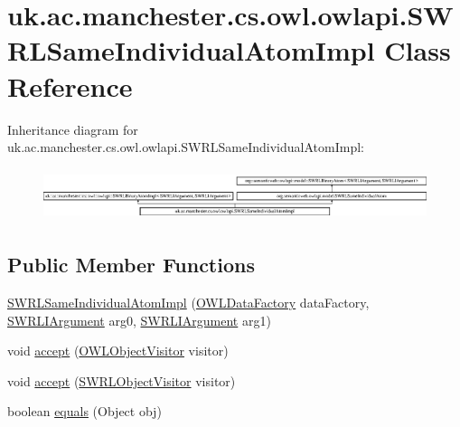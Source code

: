 \hypertarget{classuk_1_1ac_1_1manchester_1_1cs_1_1owl_1_1owlapi_1_1_s_w_r_l_same_individual_atom_impl}{\section{uk.\-ac.\-manchester.\-cs.\-owl.\-owlapi.\-S\-W\-R\-L\-Same\-Individual\-Atom\-Impl Class Reference}
\label{classuk_1_1ac_1_1manchester_1_1cs_1_1owl_1_1owlapi_1_1_s_w_r_l_same_individual_atom_impl}
}
Inheritance diagram for uk.\-ac.\-manchester.\-cs.\-owl.\-owlapi.\-S\-W\-R\-L\-Same\-Individual\-Atom\-Impl\-:\begin{figure}[H]
\begin{center}
\leavevmode
\includegraphics[height=1.521739cm]{classuk_1_1ac_1_1manchester_1_1cs_1_1owl_1_1owlapi_1_1_s_w_r_l_same_individual_atom_impl}
\end{center}
\end{figure}
\subsection*{Public Member Functions}
\begin{DoxyCompactItemize}
\item 
\hyperlink{classuk_1_1ac_1_1manchester_1_1cs_1_1owl_1_1owlapi_1_1_s_w_r_l_same_individual_atom_impl_a54ab8b82db0501ec774d299d85220734}{S\-W\-R\-L\-Same\-Individual\-Atom\-Impl} (\hyperlink{interfaceorg_1_1semanticweb_1_1owlapi_1_1model_1_1_o_w_l_data_factory}{O\-W\-L\-Data\-Factory} data\-Factory, \hyperlink{interfaceorg_1_1semanticweb_1_1owlapi_1_1model_1_1_s_w_r_l_i_argument}{S\-W\-R\-L\-I\-Argument} arg0, \hyperlink{interfaceorg_1_1semanticweb_1_1owlapi_1_1model_1_1_s_w_r_l_i_argument}{S\-W\-R\-L\-I\-Argument} arg1)
\item 
void \hyperlink{classuk_1_1ac_1_1manchester_1_1cs_1_1owl_1_1owlapi_1_1_s_w_r_l_same_individual_atom_impl_aff66cd77a791d8cb3e1d6ed560108dff}{accept} (\hyperlink{interfaceorg_1_1semanticweb_1_1owlapi_1_1model_1_1_o_w_l_object_visitor}{O\-W\-L\-Object\-Visitor} visitor)
\item 
void \hyperlink{classuk_1_1ac_1_1manchester_1_1cs_1_1owl_1_1owlapi_1_1_s_w_r_l_same_individual_atom_impl_a7177593ec26c2286fba55f7b5ddcc8f8}{accept} (\hyperlink{interfaceorg_1_1semanticweb_1_1owlapi_1_1model_1_1_s_w_r_l_object_visitor}{S\-W\-R\-L\-Object\-Visitor} visitor)
\item 
boolean \hyperlink{classuk_1_1ac_1_1manchester_1_1cs_1_1owl_1_1owlapi_1_1_s_w_r_l_same_individual_atom_impl_a45f6040ef014c1515e4d860d8e2ba673}{equals} (Object obj)
\end{DoxyCompactItemize}
